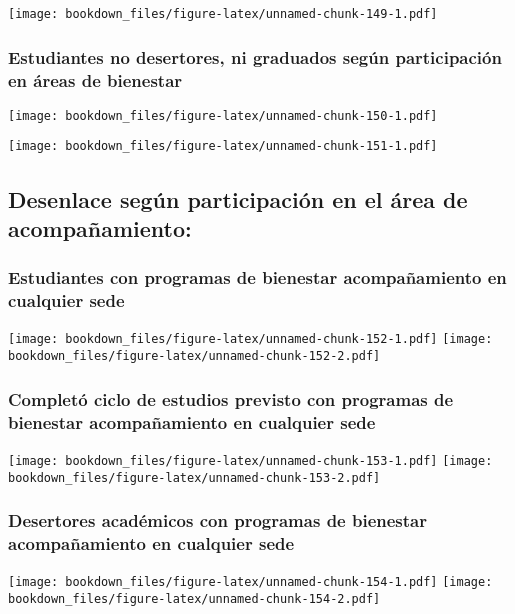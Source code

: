 \documentclass[]{article}
\theoremstyle{definition}
\theoremstyle{definition}
\theoremstyle{definition}
\theoremstyle{remark}
\begin{document}
\texttt{[image: bookdown\_files/figure-latex/unnamed-chunk-149-1.pdf]}

\subsubsection{Estudiantes no desertores, ni graduados según
participación en áreas de
bienestar}\label{estudiantes-no-desertores-ni-graduados-segun-participacion-en-areas-de-bienestar}

\texttt{[image: bookdown\_files/figure-latex/unnamed-chunk-150-1.pdf]}

\texttt{[image: bookdown\_files/figure-latex/unnamed-chunk-151-1.pdf]}

\subsection{Desenlace según participación en el área de
acompañamiento:}\label{desenlace-segun-participacion-en-el-area-de-acompanamiento}

\subsubsection{Estudiantes con programas de bienestar acompañamiento en
cualquier
sede}\label{estudiantes-con-programas-de-bienestar-acompanamiento-en-cualquier-sede}

\texttt{[image: bookdown\_files/figure-latex/unnamed-chunk-152-1.pdf]}
\texttt{[image: bookdown\_files/figure-latex/unnamed-chunk-152-2.pdf]}

\subsubsection{Completó ciclo de estudios previsto con programas de
bienestar acompañamiento en cualquier
sede}\label{completo-ciclo-de-estudios-previsto-con-programas-de-bienestar-acompanamiento-en-cualquier-sede}

\texttt{[image: bookdown\_files/figure-latex/unnamed-chunk-153-1.pdf]}
\texttt{[image: bookdown\_files/figure-latex/unnamed-chunk-153-2.pdf]}

\subsubsection{Desertores académicos con programas de bienestar
acompañamiento en cualquier
sede}\label{desertores-academicos-con-programas-de-bienestar-acompanamiento-en-cualquier-sede}

\texttt{[image: bookdown\_files/figure-latex/unnamed-chunk-154-1.pdf]}
\texttt{[image: bookdown\_files/figure-latex/unnamed-chunk-154-2.pdf]}
\end{document}
